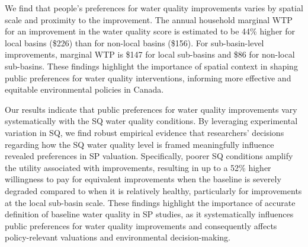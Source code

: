 \documentclass[12pt]{article}
\begin{document}
We find that people's preferences for water quality improvements varies by spatial scale and proximity to the improvement.
The annual household marginal WTP for an improvement in the water quality score is estimated to be 44\% higher for 
local basins (\$226) than for non-local basins (\$156). For sub-basin-level improvements, marginal WTP is \$147 for local sub-basins and \$86 
for non-local sub-basins. These findings highlight the importance of spatial context in shaping public preferences for water quality 
interventions, informing more effective and equitable environmental policies in Canada.

Our results indicate that public preferences for water quality improvements vary systematically with the SQ water quality conditions. 
By leveraging experimental variation in SQ, we find robust empirical evidence that researchers’ decisions regarding how the SQ water 
quality level is framed meaningfully influence revealed preferences in SP valuation. Specifically, poorer SQ conditions amplify the 
utility associated with improvements, resulting in up to a 52\% higher willingness to pay for equivalent improvements when the baseline 
is severely degraded compared to when it is relatively healthy, particularly for improvements at the local sub-basin scale. These findings 
highlight the importance of accurate definition of baseline water quality in SP studies, as it systematically influences public preferences 
for water quality improvements and consequently affects policy-relevant valuations and environmental decision-making.
\end{document}
